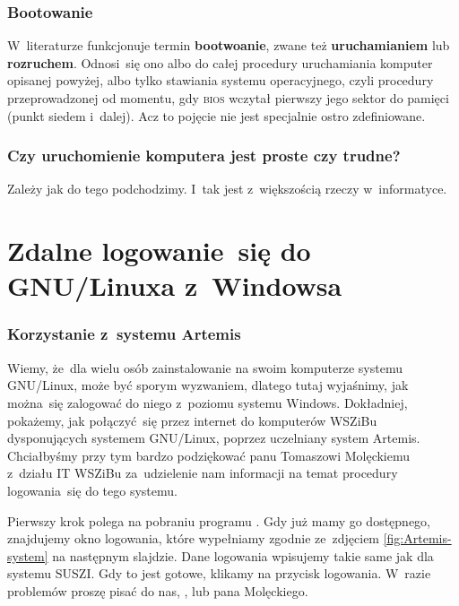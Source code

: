 \documentclass[10pt,t]{beamer}
\begin{document}
\begin{frame}
  \frametitle{Bootowanie}


  W~literaturze funkcjonuje termin \textbf{bootwoanie}, zwane też
  \textbf{uruchamianiem} lub \textbf{rozruchem}. Odnosi~się ono albo do
  całej procedury uruchamiania komputer opisanej powyżej, albo tylko
  stawiania systemu operacyjnego, czyli procedury przeprowadzonej
  od momentu, gdy \textsc{bios} wczytał pierwszy jego sektor do pamięci
  (punkt siedem i~dalej). Acz to pojęcie nie jest specjalnie ostro
  zdefiniowane.

\end{frame}





\begin{frame}
  \frametitle{Czy uruchomienie komputera jest proste czy trudne?}


  Zależy jak do tego podchodzimy. I~tak jest z~większością rzeczy
  w~informatyce.

\end{frame}










\section{Zdalne logowanie~się do GNU/Linuxa z~Windowsa}


\begin{frame}
  \frametitle{Korzystanie z~systemu Artemis}


  Wiemy, że~dla wielu osób zainstalowanie na swoim komputerze systemu
  GNU/Linux, może być sporym wyzwaniem, dlatego tutaj wyjaśnimy, jak
  można~się zalogować do niego z~poziomu systemu Windows. Dokładniej,
  pokażemy, jak połączyć~się przez internet do komputerów WSZiBu
  dysponujących systemem GNU/Linux, poprzez uczelniany system Artemis.
  Chciałbyśmy przy tym bardzo podziękować panu Tomaszowi Molęckiemu
  z~działu IT WSZiBu za~udzielenie nam informacji na temat procedury
  logowania~się do tego systemu.

  Pierwszy krok polega na pobraniu programu
  . Gdy
  już mamy go dostępnego, znajdujemy okno logowania, które wypełniamy
  zgodnie ze~zdjęciem \eqref{fig:Artemis-system} na następnym slajdzie.
  Dane logowania wpisujemy takie same jak dla systemu SUSZI. Gdy to jest
  gotowe, klikamy na przycisk logowania. W~razie problemów proszę pisać do
  nas, \email, lub pana Molęckiego.

\end{frame}
\end{document}
